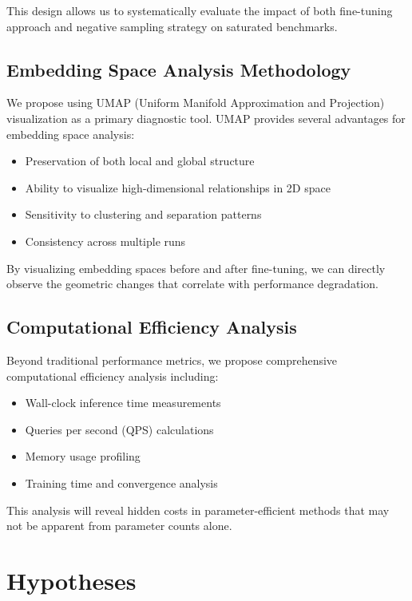 This design allows us to systematically evaluate the impact of both fine-tuning approach and negative sampling strategy on saturated benchmarks.

\subsection{Embedding Space Analysis Methodology}

We propose using UMAP (Uniform Manifold Approximation and Projection) visualization as a primary diagnostic tool. UMAP provides several advantages for embedding space analysis:

\begin{itemize}
\item Preservation of both local and global structure
\item Ability to visualize high-dimensional relationships in 2D space
\item Sensitivity to clustering and separation patterns
\item Consistency across multiple runs
\end{itemize}

By visualizing embedding spaces before and after fine-tuning, we can directly observe the geometric changes that correlate with performance degradation.

\subsection{Computational Efficiency Analysis}

Beyond traditional performance metrics, we propose comprehensive computational efficiency analysis including:

\begin{itemize}
\item Wall-clock inference time measurements
\item Queries per second (QPS) calculations
\item Memory usage profiling
\item Training time and convergence analysis
\end{itemize}

This analysis will reveal hidden costs in parameter-efficient methods that may not be apparent from parameter counts alone.

\section{Hypotheses}

